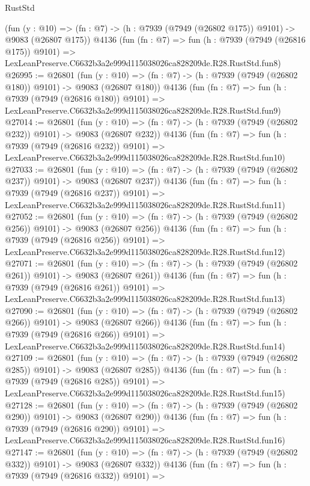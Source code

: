 \begin{lexlean}{RustStd}
\begin{coremodule}
    (fun (y : @10) => (fn : @7) -> (h : @7939 (@7949 (@26802 @175)) @9101) -> @9083 (@26807 @175))
    @4136
    (fun (fn : @7) =>
    fun (h : @7939 (@7949 (@26816 @175)) @9101) =>
    LexLeanPreserve.C6632b3a2e999d115038026ca828209de.R28.RustStd.fun8)
@26995 := @26801
    (fun (y : @10) => (fn : @7) -> (h : @7939 (@7949 (@26802 @180)) @9101) -> @9083 (@26807 @180))
    @4136
    (fun (fn : @7) =>
    fun (h : @7939 (@7949 (@26816 @180)) @9101) =>
    LexLeanPreserve.C6632b3a2e999d115038026ca828209de.R28.RustStd.fun9)
@27014 := @26801
    (fun (y : @10) => (fn : @7) -> (h : @7939 (@7949 (@26802 @232)) @9101) -> @9083 (@26807 @232))
    @4136
    (fun (fn : @7) =>
    fun (h : @7939 (@7949 (@26816 @232)) @9101) =>
    LexLeanPreserve.C6632b3a2e999d115038026ca828209de.R28.RustStd.fun10)
@27033 := @26801
    (fun (y : @10) => (fn : @7) -> (h : @7939 (@7949 (@26802 @237)) @9101) -> @9083 (@26807 @237))
    @4136
    (fun (fn : @7) =>
    fun (h : @7939 (@7949 (@26816 @237)) @9101) =>
    LexLeanPreserve.C6632b3a2e999d115038026ca828209de.R28.RustStd.fun11)
@27052 := @26801
    (fun (y : @10) => (fn : @7) -> (h : @7939 (@7949 (@26802 @256)) @9101) -> @9083 (@26807 @256))
    @4136
    (fun (fn : @7) =>
    fun (h : @7939 (@7949 (@26816 @256)) @9101) =>
    LexLeanPreserve.C6632b3a2e999d115038026ca828209de.R28.RustStd.fun12)
@27071 := @26801
    (fun (y : @10) => (fn : @7) -> (h : @7939 (@7949 (@26802 @261)) @9101) -> @9083 (@26807 @261))
    @4136
    (fun (fn : @7) =>
    fun (h : @7939 (@7949 (@26816 @261)) @9101) =>
    LexLeanPreserve.C6632b3a2e999d115038026ca828209de.R28.RustStd.fun13)
@27090 := @26801
    (fun (y : @10) => (fn : @7) -> (h : @7939 (@7949 (@26802 @266)) @9101) -> @9083 (@26807 @266))
    @4136
    (fun (fn : @7) =>
    fun (h : @7939 (@7949 (@26816 @266)) @9101) =>
    LexLeanPreserve.C6632b3a2e999d115038026ca828209de.R28.RustStd.fun14)
@27109 := @26801
    (fun (y : @10) => (fn : @7) -> (h : @7939 (@7949 (@26802 @285)) @9101) -> @9083 (@26807 @285))
    @4136
    (fun (fn : @7) =>
    fun (h : @7939 (@7949 (@26816 @285)) @9101) =>
    LexLeanPreserve.C6632b3a2e999d115038026ca828209de.R28.RustStd.fun15)
@27128 := @26801
    (fun (y : @10) => (fn : @7) -> (h : @7939 (@7949 (@26802 @290)) @9101) -> @9083 (@26807 @290))
    @4136
    (fun (fn : @7) =>
    fun (h : @7939 (@7949 (@26816 @290)) @9101) =>
    LexLeanPreserve.C6632b3a2e999d115038026ca828209de.R28.RustStd.fun16)
@27147 := @26801
    (fun (y : @10) => (fn : @7) -> (h : @7939 (@7949 (@26802 @332)) @9101) -> @9083 (@26807 @332))
    @4136
    (fun (fn : @7) =>
    fun (h : @7939 (@7949 (@26816 @332)) @9101) =>

\end{coremodule}
\end{lexlean}
